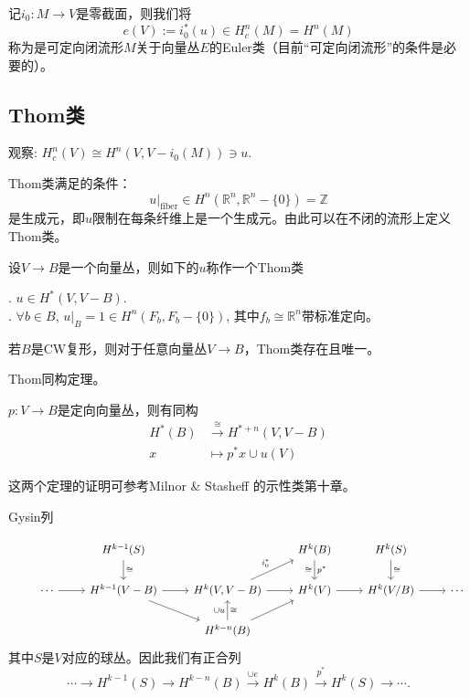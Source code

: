     \qquad 记$i_0: M \rightarrow V$是零截面，则我们将
        $$e(V):= i_0^*(u) \in H_c^n(M) =H^n(M)$$
称为是可定向闭流形$M$关于向量丛$E$的Euler类（目前“可定向闭流形”的条件是必要的）。

\subsection{Thom类}
    \qquad 观察: $H^n_c(V) \cong H^n(V, V-i_0(M)) \ni u$.

    \qquad Thom类满足的条件：
        $$u|_{\text{fiber}} \in H^n( \mathbb{R}^n, \mathbb{R}^n-\{0\})= \mathbb{Z}$$
    是生成元，即$u$限制在每条纤维上是一个生成元。由此可以在不闭的流形上定义Thom类。

    \qquad 设$V \rightarrow B$是一个向量丛，则如下的$u$称作一个Thom类
        
        \qquad {}. $u\in H^*(V, V- B)$.\\

        \qquad {}. $\forall b \in B$, $u|_B =1\in H^n(F_b, F_b - \{0\})$, 
        其中$f_b \cong \mathbb{R}^n$带标准定向。

    \begin{theorem}
        若$B$是CW复形，则对于任意向量丛$V\rightarrow B$，Thom类存在且唯一。
    \end{theorem}

    \begin{theorem}
        Thom同构定理。

        \qquad $p: V\rightarrow B$是定向向量丛，则有同构
            \begin{align*}
                H^*(B) &\stackrel{\cong}{\rightarrow} H^{*+n}(V, V-B)\\
                x &\mapsto p^* x \cup u(V)
            \end{align*}
    \end{theorem}

    这两个定理的证明可参考Milnor & Stasheff 的示性类第十章。

    \begin{proposition}
        Gysin列

       $$ \begin{tikzcd}
        & &H^{k-1}(S) \dar["\cong"] & &H^k(B) \dar["\cong"']{p^*} &H^k(S) \dar["\cong"] & \\
        &\cdots \rar &H^{k-1}(V-B) \rar \drar &H^k(V, V-B)\urar["i_0^*"] \rar &H^k(V) \rar &H^k(V/B) \rar &\cdots\\
        & & &H^{k-n}(B) \uar["\cong"']{\cup u} \urar & & &
       \end{tikzcd}$$
    其中$S$是$V$对应的球丛。因此我们有正合列
        $$\cdots \rightarrow H^{k-1}(S) \rightarrow H^{k-n}(B) 
        \stackrel{\cup e}{\longrightarrow} H^k(B) 
        \stackrel{p^*}{\longrightarrow} H^k(S) \rightarrow \cdots.$$
    \end{proposition}

